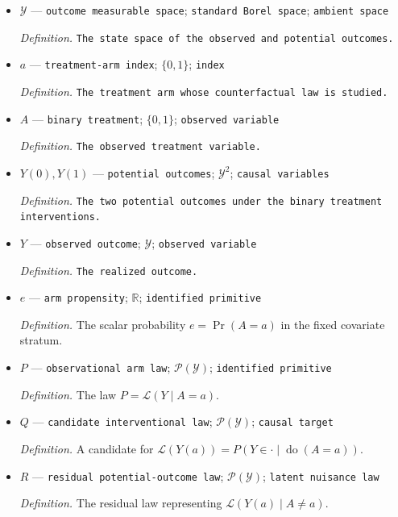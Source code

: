 \documentclass{article}
\begin{document}
\begin{itemize}
  \item \(\mathcal Y\) --- \texttt{outcome measurable space}; \texttt{standard Borel space}; \texttt{ambient space}
  \par\smallskip\noindent\emph{Definition.} \texttt{The state space of the observed and potential outcomes.}
  \item \(a\) --- \texttt{treatment-\allowbreak{}arm index}; \(\{0,1\}\); \texttt{index}
  \par\smallskip\noindent\emph{Definition.} \texttt{The treatment arm whose counterfactual law is studied.}
  \item \(A\) --- \texttt{binary treatment}; \(\{0,1\}\); \texttt{observed variable}
  \par\smallskip\noindent\emph{Definition.} \texttt{The observed treatment variable.}
  \item \(Y(0),Y(1)\) --- \texttt{potential outcomes}; \(\mathcal Y^2\); \texttt{causal variables}
  \par\smallskip\noindent\emph{Definition.} \texttt{The two potential outcomes under the binary treatment interventions.}
  \item \(Y\) --- \texttt{observed outcome}; \(\mathcal Y\); \texttt{observed variable}
  \par\smallskip\noindent\emph{Definition.} \texttt{The realized outcome.}
  \item \(e\) --- \texttt{arm propensity}; \(\mathbb R\); \texttt{identified primitive}
  \par\smallskip\noindent\emph{Definition.} The scalar probability \(e=\Pr(A=a)\) in the fixed covariate stratum.
  \item \(P\) --- \texttt{observational arm law}; \(\mathcal P(\mathcal Y)\); \texttt{identified primitive}
  \par\smallskip\noindent\emph{Definition.} The law \(P=\mathcal L(Y\mid A=a)\).
  \item \(Q\) --- \texttt{candidate interventional law}; \(\mathcal P(\mathcal Y)\); \texttt{causal target}
  \par\smallskip\noindent\emph{Definition.} A candidate for \(\mathcal L(Y(a))=P(Y\in\cdot\mid\operatorname{do}(A=a))\).
  \item \(R\) --- \texttt{residual potential-\allowbreak{}outcome law}; \(\mathcal P(\mathcal Y)\); \texttt{latent nuisance law}
  \par\smallskip\noindent\emph{Definition.} The residual law representing \(\mathcal L(Y(a)\mid A\ne a)\).

\end{itemize}
\end{document}
